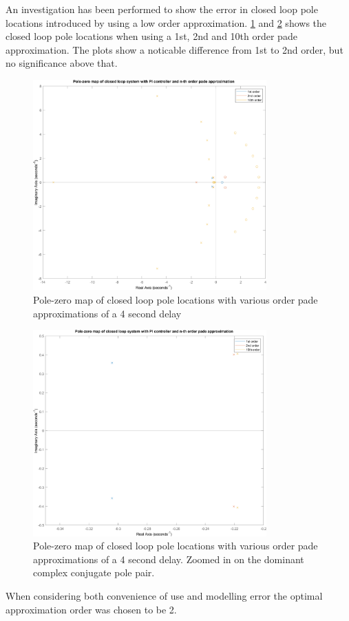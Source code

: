 An investigation has been performed to show the error in closed loop pole locations introduced by using a low order approximation. \cref{fig:CLPoles} and \cref{fig:CLPolesZoom} shows the closed loop pole locations when using a 1st, 2nd and 10th order pade approximation. The plots show a noticable difference from 1st to 2nd order, but no significance above that.

\begin{figure}[h!]
	\centering
	\includegraphics[width=0.8\textwidth]{Pictures/PZmap_CL.png}
	\caption{Pole-zero map of closed loop pole locations with various order pade approximations of a 4 second delay}
	\label{fig:CLPoles}
\end{figure}
\begin{figure}[h!]
	\centering
	\includegraphics[width=0.8\textwidth]{Pictures/PZmap_CL_zoom.png}
	\caption{Pole-zero map of closed loop pole locations with various order pade approximations of a 4 second delay. Zoomed in on the dominant complex conjugate pole pair.}
	\label{fig:CLPolesZoom}
\end{figure}
When considering both convenience of use and modelling error the optimal approximation order was chosen to be 2.



